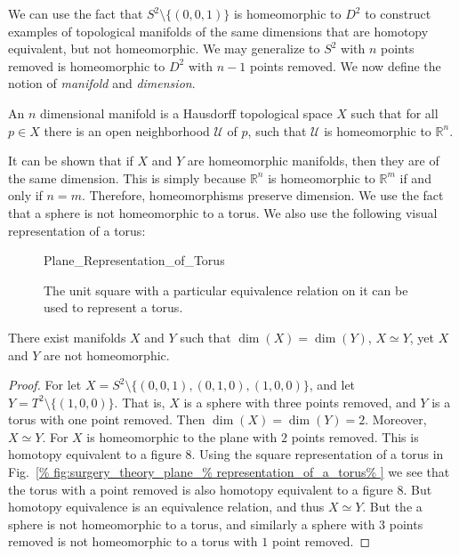 \documentclass[crop=false,class=article,oneside]{standalone}
\begin{document}
        We can use the fact that $S^{2}\setminus \{(0,0,1)\}$
        is homeomorphic to $D^{2}$ to construct examples of
        topological manifolds of the same dimensions that are
        homotopy equivalent, but not homeomorphic. We may
        generalize to $S^{2}$ with $n$ points removed is
        homeomorphic to $D^{2}$ with $n-1$ points removed.
        We now define the notion of
        \textit{manifold} and \textit{dimension}.
        \begin{definition}
            An $n$ dimensional manifold is a Hausdorff
            topological space $X$ such that for all
            $p\in{X}$ there is an open neighborhood
            $\mathcal{U}$ of $p$, such that $\mathcal{U}$
            is homeomorphic to $\mathbb{R}^{n}$.
        \end{definition}
        It can be shown that if $X$ and $Y$ are homeomorphic
        manifolds, then they are of the same dimension.
        This is simply because $\mathbb{R}^{n}$ is homeomorphic
        to $\mathbb{R}^{m}$ if and only if $n=m$. Therefore,
        homeomorphisms preserve dimension. We use the fact that
        a sphere is not homeomorphic to a torus. We also use
        the following visual representation of a torus:
        \begin{figure}[H]
            \centering
            \captionsetup{type=figure}
            
                      {Plane_Representation_of_Torus}
            \caption[Plane Representation of a Torus]
                    {The unit square with a particular
                     equivalence relation on it can be
                     used to represent a torus.}
            \label{fig:surgery_theory_plane_%
                   representation_of_a_torus}
        \end{figure}
        \begin{theorem}
            There exist manifolds $X$ and $Y$ such that
            $\dim(X)=\dim(Y)$, ${X}\simeq{Y}$,
            yet $X$ and $Y$ are not homeomorphic.
        \end{theorem}
        \begin{proof}
            For let
            $X=S^{2}\setminus\{(0,0,1),(0,1,0),(1,0,0)\}$,
            and let
            $Y=T^{2}\setminus\{(1,0,0)\}$.
            That is, $X$ is a sphere with three points removed,
            and $Y$ is a torus with one point removed. Then
            $\dim(X)=\dim(Y)=2$.
            Moreover, $X\simeq Y$. For $X$ is homeomorphic
            to the plane with $2$ points removed. This is
            homotopy equivalent to a figure $8$.
            Using the square representation of a torus in
            Fig.~\ref{%
                fig:surgery_theory_plane_%
                representation_of_a_torus%
            }
            we see that the torus with a point removed
            is also homotopy equivalent to a figure $8$.
            But homotopy equivalence is an equivalence
            relation, and thus $X\simeq Y$. But the a sphere
            is not homeomorphic to a torus, and similarly a
            sphere with $3$ points removed is not homeomorphic
            to a torus with $1$ point removed.
        \end{proof}
\end{document}
